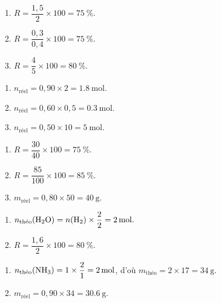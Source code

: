 \documentclass[11pt,a4paper]{article}
\begin{document}
\begin{corrige}
\begin{enumerate}[label=\alph*)]
  \item $R=\dfrac{1,5}{2}\times100=\qty{75}{\percent}.$
  \item $R=\dfrac{0,3}{0,4}\times100=\qty{75}{\percent}.$
  \item $R=\dfrac{4}{5}\times100=\qty{80}{\percent}.$
\end{enumerate}
\end{corrige}

\begin{corrige}
\begin{enumerate}[label=\alph*)]
  \item $n_{\text{réel}}=0,90\times2=\qty{1.8}{\mole}.$
  \item $n_{\text{réel}}=0,60\times0,5=\qty{0.3}{\mole}.$
  \item $n_{\text{réel}}=0,50\times10=\qty{5}{\mole}.$
\end{enumerate}
\end{corrige}

\begin{corrige}
\begin{enumerate}[label=\alph*)]
  \item $R=\dfrac{30}{40}\times100=\qty{75}{\percent}.$
  \item $R=\dfrac{85}{100}\times100=\qty{85}{\percent}.$
  \item $m_{\text{réel}}=0,80\times50=\qty{40}{\gram}.$
\end{enumerate}
\end{corrige}

\begin{corrige}
\begin{enumerate}[label=\alph*)]
  \item $n_{\text{théo}}(\ce{H2O})=n(\ce{H2})\times\dfrac{2}{2}=\qty{2}{\mole}.$
  \item $R=\dfrac{1,6}{2}\times100=\qty{80}{\percent}.$
\end{enumerate}
\end{corrige}

\begin{corrige}
\begin{enumerate}[label=\alph*)]
  \item $n_{\text{théo}}(\ce{NH3})=1\times\dfrac{2}{1}=\qty{2}{\mole}$, d'où
        $m_{\text{théo}}=2\times17=\qty{34}{\gram}.$
  \item $m_{\text{réel}}=0,90\times34=\qty{30.6}{\gram}.$
\end{enumerate}
\end{corrige}
\end{document}
